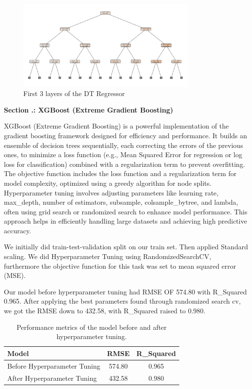 \documentclass{article}
\newcounter{chapter}
\newcounter{subchapter}[chapter]
\renewcommand{\thechapter}{\arabic{chapter}}
\renewcommand{\thesubchapter}{\thechapter.\arabic{subchapter}}
\newcommand{\mysubchapter}[1]{
    \stepcounter{subchapter}
    \clearpage %
    \noindent
    \begin{center}
        \Large\bfseries Section \thesubchapter: #1
    \end{center}
    \vspace{0.25in} %
}
\begin{document}
\begin{figure}[H] %
    \centering
    \includegraphics[width=0.8\textwidth]{dt.png} %
    \caption{First 3 layers of the DT Regressor} %
    \label{fig:dt} %
\end{figure}


\mysubchapter{XGBoost (Extreme Gradient Boosting)}

XGBoost (Extreme Gradient Boosting) is a powerful implementation of the gradient boosting framework designed for efficiency and performance. It builds an ensemble of decision trees sequentially, each correcting the errors of the previous ones, to minimize a loss function (e.g., Mean Squared Error for regression or log loss for classification) combined with a regularization term to prevent overfitting. The objective function includes the loss function and a regularization term for model complexity, optimized using a greedy algorithm for node splits. Hyperparameter tuning involves adjusting parameters like learning rate, max\_depth, number of estimators, subsample, colsample\_bytree, and lambda, often using grid search or randomized search to enhance model performance. This approach helps in efficiently handling large datasets and achieving high predictive accuracy.

We initially did train-test-validation split on our train set. Then applied Standard scaling.
We did Hyperparameter Tuning using RandomizedSearchCV, furthermore the objective function for this task was set to mean squared error (MSE). 

Our model before hyperparameter tuning had RMSE OF 574.80 with R\_Squared 0.965. After applying the best parameters found through randomized search cv, we got the RMSE down to 432.58, with R\_Squared raised to 0.980.

\begin{table}[H] %
    \centering
    \begin{tabular}{|l|c|c|}
        \hline
        \textbf{Model} & \textbf{RMSE} & \textbf{R\_Squared} \\
        \hline
        Before Hyperparameter Tuning & 574.80 & 0.965 \\
        \hline
        After Hyperparameter Tuning & 432.58 & 0.980 \\
        \hline
    \end{tabular}
    \caption{Performance metrics of the model before and after hyperparameter tuning.}
    \label{tab:model_performance}
\end{table}
\end{document}
